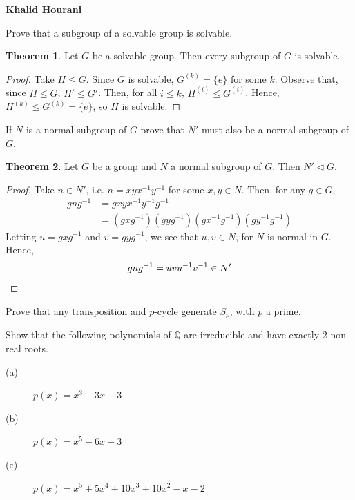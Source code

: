 \documentclass[12pt,leqno]{article}
\numberwithin{equation}{section}
\newcommand{\question}[2] {\vspace{.25in} \noindent\fbox{#1} #2 \vspace{.10in}}
\theoremstyle{definition}
\newtheorem*{Thm}{Theorem}
\begin{document}
\thispagestyle{plain}
\begin{flushright}
\large{\textbf{Khalid Hourani\\
}}
\end{flushright}

\question{2}{Prove that a subgroup of a solvable group is solvable.}

\begin{Thm}
 Let $G$ be a solvable group. Then every subgroup of $G$ is solvable.
\end{Thm}

\begin{proof}
 Take $H\leq G$. Since $G$ is solvable, $G^{(k)}=\{e\}$ for some $k$. Observe that, since $H\leq G$, $H'\leq G'$. Then, for all $i\leq k$, $H^{(i)}\leq G^{(i)}$. Hence, $H^{(k)}\leq G^{(k)}=\{e\}$, so $H$ is solvable.  
\end{proof}

\question{5}{If $N$ is a normal subgroup of $G$ prove that $N'$ must also be a normal subgroup of $G$.}

\begin{Thm}
 Let $G$ be a group and $N$ a normal subgroup of $G$. Then $N'\triangleleft G$.
\end{Thm}

\begin{proof}
 Take $n\in N'$, i.e. $n=xyx^{-1}y^{-1}$ for some $x,y\in N$. Then, for any $g\in G$, \begin{align*}gng^{-1}&=gxyx^{-1}y^{-1}g^{-1}\\&=(gxg^{-1})(gyg^{-1})(gx^{-1}g^{-1})(gy^{-1}g^{-1})\end{align*} Letting $u=gxg^{-1}$ and $v=gyg^{-1}$, we see that $u,v\in N$, for $N$ is normal in $G$. Hence, \[gng^{-1}=uvu^{-1}v^{-1}\in N'\qedhere\]
\end{proof}

\question{4}{Prove that any transposition and $p$-cycle generate $S_p$, with $p$ a prime.}


\question{5}{Show that the following polynomials of $\mathbb{Q}$ are irreducible and have exactly 2 non-real roots.}
\begin{description}
 \item [(a)] $p(x)=x^3-3x-3$
 \item [(b)] $p(x)=x^5-6x+3$
 \item [(c)] $p(x)=x^5+5x^4+10x^3+10x^2-x-2$
\end{description}
\end{document}
